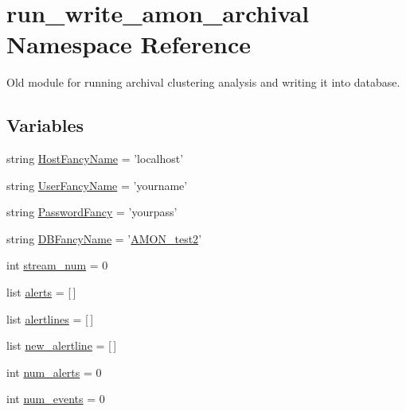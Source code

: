 \hypertarget{namespacerun__write__amon__archival}{\section{run\-\_\-write\-\_\-amon\-\_\-archival Namespace Reference}
\label{namespacerun__write__amon__archival}
}


Old module for running archival clustering analysis and writing it into database.  


\subsection*{Variables}
\begin{DoxyCompactItemize}
\item 
string \hyperlink{namespacerun__write__amon__archival_a418652887cb52c9b7abc4544caca7083}{Host\-Fancy\-Name} = 'localhost'
\item 
string \hyperlink{namespacerun__write__amon__archival_a840b590aab36a7b141e8c6fe6a27b963}{User\-Fancy\-Name} = 'yourname'
\item 
string \hyperlink{namespacerun__write__amon__archival_a6d8f0d476b812d8f56f07ad64bed30bc}{Password\-Fancy} = 'yourpass'
\item 
string \hyperlink{namespacerun__write__amon__archival_aa5de6eb45154aab7354efcde2d06c6f1}{D\-B\-Fancy\-Name} = '\hyperlink{db__mc__build_8sql_a19c21c59303d8b6591b92240ff7de1d5}{A\-M\-O\-N\-\_\-test2}'
\item 
int \hyperlink{namespacerun__write__amon__archival_a91764501aeed2509e7b7213785137320}{stream\-\_\-num} = 0
\item 
list \hyperlink{namespacerun__write__amon__archival_abd8b881689287fad598983ba07273f73}{alerts} = \mbox{[}$\,$\mbox{]}
\item 
list \hyperlink{namespacerun__write__amon__archival_a89d71b1c3dfca6e5a3c8b3576de0ab1c}{alertlines} = \mbox{[}$\,$\mbox{]}
\item 
list \hyperlink{namespacerun__write__amon__archival_a55e4dda164db25cc5b20d14aef67c4bf}{new\-\_\-alertline} = \mbox{[}$\,$\mbox{]}
\item 
int \hyperlink{namespacerun__write__amon__archival_a581cb7e60aab57263c785d923a66031f}{num\-\_\-alerts} = 0
\item 
int \hyperlink{namespacerun__write__amon__archival_a722c615f2684475c26e7d0421bf0b13c}{num\-\_\-events} = 0
\item 

\end{DoxyCompactItemize}
